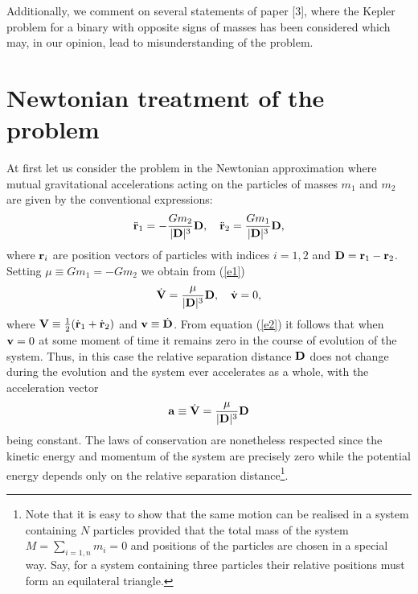 \documentclass[aip,nofootinbib]{revtex4}
\begin{document}
Additionally, we comment on several statements of paper [3], where
the Kepler problem for a binary with opposite signs of masses has
been considered which may, in our opinion, lead to
misunderstanding of the problem.




\section{Newtonian treatment of the problem}

At first let us consider the problem in the Newtonian
approximation where mutual gravitational accelerations acting on
the particles of masses $m_1$ and $m_2$ are given by the
conventional expressions:
\begin{equation}
\ddot {\bf r}_1=-{Gm_2\over |{\bf D}|^3}{\bf D},  \quad \ddot {\bf
r}_2={Gm_1\over |{\bf D}|^3}{\bf D}, \label{e1}
\end{equation}
where ${\bf r}_i$ are position vectors of particles with indices
$i=1,2$ and ${\bf D}={\bf r}_{1}-{\bf r}_2$. Setting $\mu \equiv
Gm_1=-Gm_2$ we obtain from (\ref{e1})
\begin{equation}
\dot {\bf V}= {\mu \over |{\bf D}|^3}{\bf D}, \quad \dot {\bf v} =
0, \label{e2}
\end{equation}
where ${\bf V}\equiv {1\over 2}(\dot {\bf r}_1+ \dot {\bf r}_2)$
and ${\bf v}\equiv \dot {\bf D}$. From equation (\ref {e2}) it
follows that when ${\bf v}=0$ at some moment of time it remains
zero in the course of evolution of the system. Thus, in this case
the relative separation distance ${\bf D} $ does not change during
the evolution and the system ever accelerates as a whole, with the
acceleration vector
\begin{equation}
{\bf a}\equiv \dot {\bf V}= {\mu \over |{\bf D}|^3}{\bf D}
\label{e3}
\end{equation}
being constant. The laws of conservation are nonetheless respected
since the kinetic energy and momentum of the system are precisely
zero while the potential energy depends only on the relative
separation distance\footnote{Note that it is easy to show that the
same motion can be realised in a system containing $N$ particles
provided that the total mass of the system $M=\sum_{i=1,n} m_i =0
$ and positions of the particles are chosen in a special way. Say,
for a system containing three particles their relative positions
must form an equilateral triangle.}.
\end{document}
